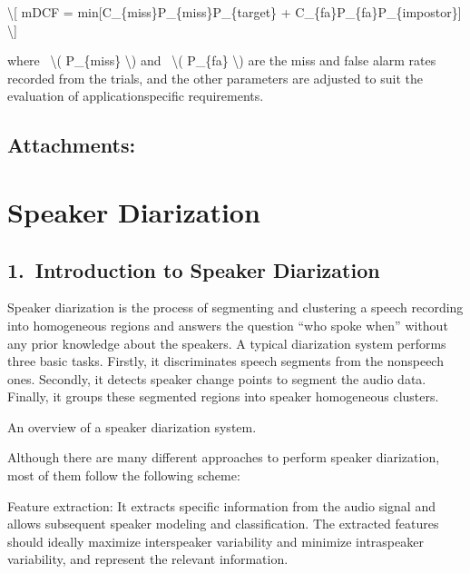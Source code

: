 \documentclass[letterpaper,10pt,english]{jupyterBook}
\begin{document}
\sphinxAtStartPar
\textbackslash{}{[} mDCF = min{[}C\_\{miss\}P\_\{miss\}P\_\{target\} +
C\_\{fa\}P\_\{fa\}P\_\{impostor\}{]} \textbackslash{}{]}

\sphinxAtStartPar
where  \textbackslash{}( P\_\{miss\} \textbackslash{}) and  \textbackslash{}( P\_\{fa\} \textbackslash{}) are the miss and false
alarm rates recorded from the trials, and the other parameters are
adjusted to suit the evaluation of application\sphinxhyphen{}specific requirements.




\subsection{Attachments:}
\label{\detokenize{Recognition/Speaker_Recognition_and_Verification:attachments}}








\sphinxstepscope


\section{Speaker Diarization}
\label{\detokenize{Recognition/Speaker_Diarization:speaker-diarization}}\label{\detokenize{Recognition/Speaker_Diarization::doc}}

\subsection{1. Introduction to Speaker Diarization}
\label{\detokenize{Recognition/Speaker_Diarization:introduction-to-speaker-diarization}}
\sphinxAtStartPar
Speaker diarization is the process of segmenting and clustering a speech
recording into homogeneous regions and answers the question “who spoke
when” without any prior knowledge about the speakers. A typical
diarization system performs three basic tasks. Firstly, it discriminates
speech segments from the non\sphinxhyphen{}speech ones. Secondly, it detects speaker
change points to segment the audio data. Finally, it groups these
segmented regions into speaker homogeneous clusters.

\sphinxAtStartPar
An overview of a speaker diarization system.

\sphinxAtStartPar
Although there are many different approaches to perform speaker
diarization, most of them follow the following scheme:

\sphinxAtStartPar
Feature extraction: It extracts specific information from the audio
signal and allows subsequent speaker modeling and classification. The
extracted features should ideally maximize inter\sphinxhyphen{}speaker variability and
minimize intra\sphinxhyphen{}speaker variability, and represent the relevant
information.
\end{document}
